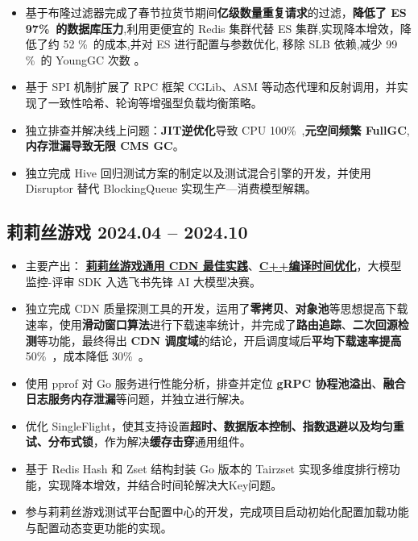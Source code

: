 \documentclass{resume}
\renewcommand{\datedsubsection}[2]{
  \subsection*{\fontsize{10pt}{14pt}\selectfont \textbf{#1} \hfill #2}
}
\begin{document}
\begin{itemize}
  \item 基于布隆过滤器完成了春节拉货节期间\textbf{亿级数量重复请求}的过滤，\textbf{降低了 ES  97\%\ 的数据库压力},利用更便宜的 Redis 集群代替 ES 集群,实现降本增效，降低了约 52 \%\ 的成本,并对 ES 进行配置与参数优化, 移除 SLB 依赖,减少 99 \%\ 的 YoungGC 次数 。


  \item 基于 SPI 机制扩展了        RPC        框架        CGLib、ASM        等动态代理和反射调用，并实现了一致性哈希、轮询等增强型负载均衡策略。

  \item {独立排查并解决线上问题：\textbf{JIT逆优化}导致 CPU 100\%\ ,\textbf{元空间频繁 FullGC},\textbf{内存泄漏导致无限        CMS        GC}。}
  \item 独立完成 Hive 回归测试方案的制定以及测试混合引擎的开发，并使用 Disruptor 替代 BlockingQueue 实现生产—消费模型解耦。

\end{itemize}

\datedsubsection{\hspace{2em}\textbf{莉莉丝游戏}}{2024.04 -- 2024.10}
\begin{itemize}
  \item 主要产出：        \href{https://jcn9lm5pjtx7.feishu.cn/wiki/AeyhwuVfIiQuO7kEysTcLhfUn4d?from=from_copylink}{\textbf{莉莉丝游戏通用 CDN 最佳实践}}、\href{https://jcn9lm5pjtx7.feishu.cn/wiki/ALS2whLI0iGgQskPk30cdr1QnJf}{\textbf{C++编译时间优化}}，大模型监控-评审 SDK 入选飞书先锋        AI        大模型决赛。

  \item 独立完成        CDN        质量探测工具的开发，运用了\textbf{零拷贝}、\textbf{对象池}等思想提高下载速率，使用\textbf{滑动窗口算法}进行下载速率统计，并完成了\textbf{路由追踪}、\textbf{二次回源检测}等功能，最终得出 \textbf{CDN 调度域}的结论，开启调度域后\textbf{平均下载速率提高}        50\%\ ，成本降低 30\%\ 。

  \item 使用        pprof        对        Go        服务进行性能分析，排查并定位        \textbf{gRPC        协程池溢出}、\textbf{融合日志服务内存泄漏}等问题，并独立进行解决。
  \item 优化        SingleFlight，使其支持设置\textbf{超时、数据版本控制、指数退避以及均匀重试、分布式锁}，作为解决\textbf{缓存击穿}通用组件。
  \item 基于 Redis Hash 和 Zset 结构封装 Go 版本的 Tairzset 实现多维度排行榜功能，实现降本增效，并结合时间轮解决大Key问题。
  \item 参与莉莉丝游戏测试平台配置中心的开发，完成项目启动初始化配置加载功能与配置动态变更功能的实现。
\end{itemize}
\end{document}
